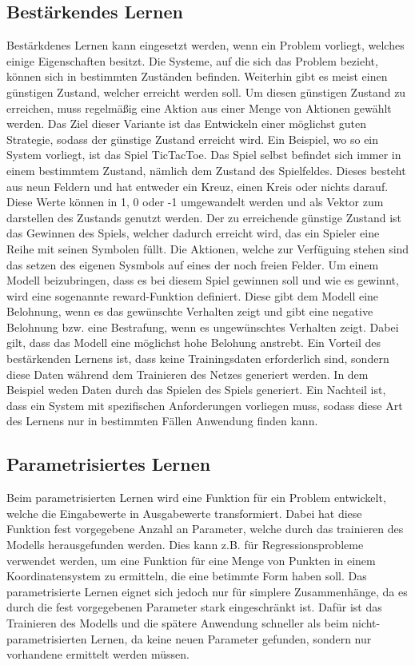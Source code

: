 \subsection{Bestärkendes Lernen}
\label{subsec:bestaerkendesLernen}
Bestärkdenes Lernen kann eingesetzt werden, wenn ein Problem vorliegt, welches einige Eigenschaften besitzt. Die Systeme, auf die sich das Problem bezieht, können sich in bestimmten Zuständen befinden. Weiterhin gibt es meist einen günstigen Zustand, welcher erreicht werden soll. Um diesen günstigen Zustand zu erreichen, muss regelmäßig eine Aktion aus einer Menge von Aktionen gewählt werden. Das Ziel dieser Variante ist das Entwickeln einer möglichst guten Strategie, sodass der günstige Zustand erreicht wird.
Ein Beispiel, wo so ein System vorliegt, ist das Spiel TicTacToe. Das Spiel selbst befindet sich immer in einem bestimmtem Zustand, nämlich dem Zustand des Spielfeldes. Dieses besteht aus neun Feldern und hat entweder ein Kreuz, einen Kreis oder nichts darauf. Diese Werte können in 1, 0 oder -1 umgewandelt werden und als Vektor zum darstellen des Zustands genutzt werden. Der zu erreichende günstige Zustand ist das Gewinnen des Spiels, welcher dadurch erreicht wird, das ein Spieler eine Reihe mit seinen Symbolen füllt. Die Aktionen, welche zur Verfüguing stehen sind das setzen des eigenen Sysmbols auf eines der noch freien Felder.
Um einem Modell beizubringen, dass es bei diesem Spiel gewinnen soll und wie es gewinnt, wird eine sogenannte reward-Funktion definiert. Diese gibt dem Modell eine Belohnung, wenn es das gewünschte Verhalten zeigt und gibt eine negative Belohnung bzw. eine Bestrafung, wenn es ungewünschtes Verhalten zeigt. Dabei gilt, dass das Modell eine möglichst hohe Belohung anstrebt.
Ein Vorteil des bestärkenden Lernens ist, dass keine Trainingsdaten erforderlich sind, sondern diese Daten während dem Trainieren des Netzes generiert werden. In dem Beispiel weden Daten durch das Spielen des Spiels generiert. Ein Nachteil ist, dass ein System mit spezifischen Anforderungen vorliegen muss, sodass diese Art des Lernens nur in bestimmten Fällen Anwendung finden kann.

\subsection{Parametrisiertes Lernen}
\label{parametrisiertesLernen}
Beim parametrisierten Lernen wird eine Funktion für ein Problem entwickelt, welche die Eingabewerte in Ausgabewerte transformiert. Dabei hat diese Funktion fest vorgegebene Anzahl an Parameter, welche durch das trainieren des Modells herausgefunden werden. Dies kann z.B. für Regressionsprobleme verwendet werden, um eine Funktion für eine Menge von Punkten in einem Koordinatensystem zu ermitteln, die eine betimmte Form haben soll.
Das parametrisierte Lernen eignet sich jedoch nur für simplere Zusammenhänge, da es durch die fest vorgegebenen Parameter stark eingeschränkt ist. Dafür ist das Trainieren des Modells und die spätere Anwendung schneller als beim nicht-parametrisierten Lernen, da keine neuen Parameter gefunden, sondern nur vorhandene ermittelt werden müssen.

